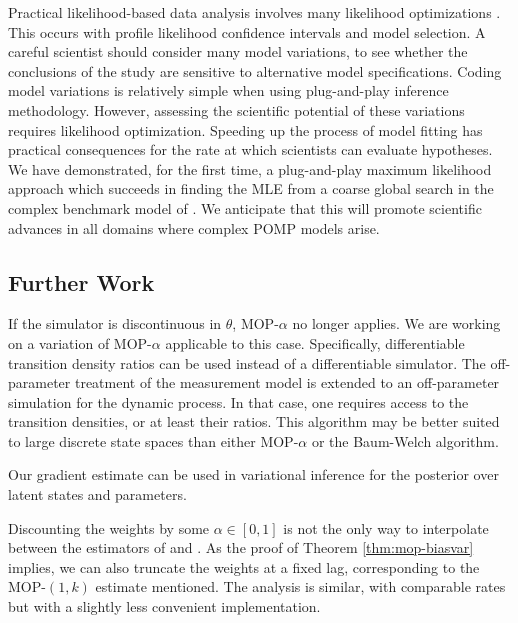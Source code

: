 \documentclass[9pt,twocolumn,pnasresearcharticle]{pnas-new}
\newcommand\arxiv[2]{#2} %
\begin{document}
Practical likelihood-based data analysis involves many likelihood optimizations \cite{king08,blake14,pons-salort18,subramanian21,fox22,drake23}.
This occurs with profile likelihood confidence intervals and model selection. A careful scientist should consider many model variations, to see whether the conclusions of the study are sensitive to alternative model specifications.
Coding model variations is relatively simple when using plug-and-play inference methodology.
However, assessing the scientific potential of these variations requires likelihood optimization.
Speeding up the process of model fitting has practical consequences for the rate at which scientists can evaluate hypotheses.
We have demonstrated, for the first time, a plug-and-play maximum likelihood approach which succeeds in finding the MLE from a coarse global search in the complex benchmark model of \cite{king08}.
We anticipate that this will promote scientific advances in all domains where complex POMP models arise.

\arxiv{}{\vspace*{-2mm}}
\subsection{Further Work}

If the simulator is discontinuous in $\theta$, MOP-$\alpha$ no longer applies.
We are working on a variation of MOP-$\alpha$ applicable to this case.
Specifically, differentiable transition density ratios can be used instead of a differentiable simulator.
The off-parameter treatment of the measurement model is extended to an off-parameter simulation for the dynamic process.
In that case, one requires access to the transition densities, or at least their ratios. 
This algorithm may be better suited to large discrete state spaces than either MOP-$\alpha$ or the Baum-Welch algorithm.

Our gradient estimate can be used in variational inference for the posterior over latent states \cite{naesseth18} and parameters. 

Discounting the weights by some $\alpha \in [0,1]$ is not the only way to interpolate between the estimators of \cite{naesseth18} and \cite{poyiadjis11}. 
As the proof of Theorem \ref{thm:mop-biasvar} implies, we can also truncate the weights at a fixed lag, corresponding to the MOP-$(1,k)$ estimate mentioned. 
The analysis is similar, with comparable rates but with a slightly less convenient implementation. 
\end{document}

